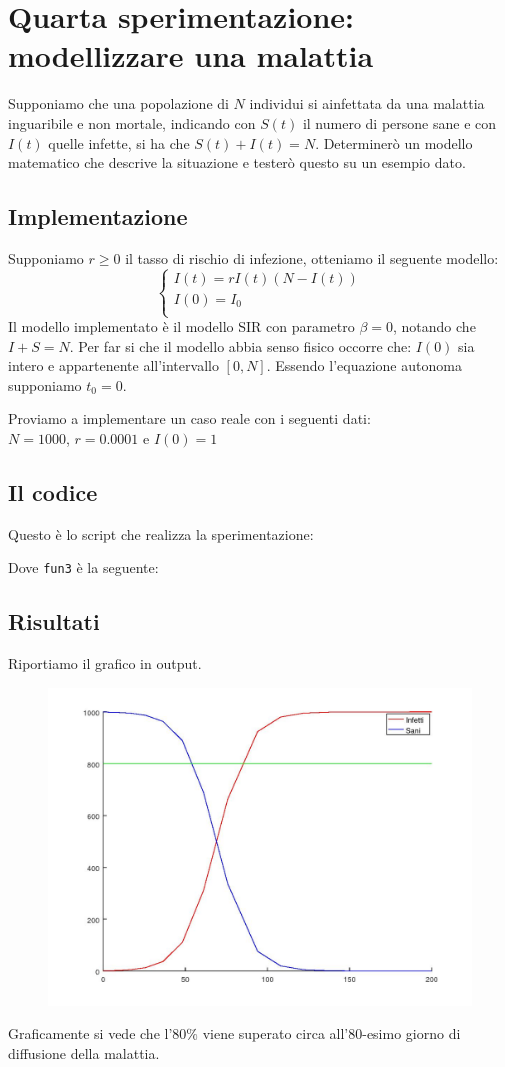 \documentclass{article}
\begin{document}
	\section{Quarta sperimentazione: modellizzare una malattia}
	Supponiamo che una popolazione di $N$ individui si ainfettata da una malattia inguaribile e non mortale, indicando con $S(t)$ il numero di persone sane e con $I(t)$ quelle infette, si ha che $S(t)+I(t)=N$. Determinerò un modello matematico che descrive la situazione e testerò questo su un esempio dato.	
	\subsection{Implementazione}
	Supponiamo $r \geq 0$ il tasso di rischio di infezione, otteniamo il seguente modello:
	\begin{equation}
	\begin{cases}
	I(t) = r I(t)(N-I(t))\\
	I(0)=I_0\\
	\end{cases}
	\end{equation}
	Il modello implementato è il modello SIR con parametro $\beta=0$, notando che $I+S=N$.
	Per far si che il modello abbia senso fisico occorre che: $I(0)$ sia intero e appartenente all'intervallo $\left[0, N\right]$. Essendo l'equazione autonoma supponiamo $t_0=0$.
	
	Proviamo a implementare un caso reale con i seguenti dati:\\
	$N=1000$, $r=0.0001$ e $I(0)=1$ 
	\subsection{Il codice}
	Questo è lo script che realizza la sperimentazione:
	
	Dove {\tt fun3} è la seguente:
	
	
	\subsection{Risultati}
	Riportiamo il grafico in output.\\
	\begin{figure}[htp!]
		\centering 
		\includegraphics[width=\textwidth]{4_4.jpeg}
	\end{figure}
	
	Graficamente si vede che l'$80\%$ viene superato circa all'80-esimo giorno di diffusione della malattia.
\end{document}
